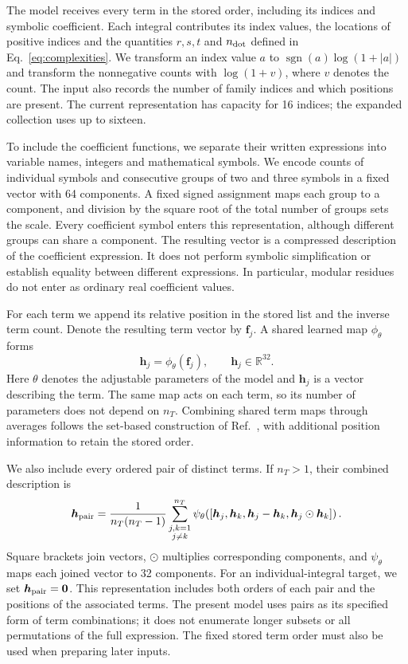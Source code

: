 The model receives every term in the stored order, including its
indices and symbolic coefficient. Each integral contributes its index
values, the locations of positive indices and the quantities $r,s,t$
and $n_{\rm dot}$ defined in Eq.~\eqref{eq:complexities}.
We transform an index value $a$ to
$\operatorname{sgn}(a)\log(1+|a|)$ and transform the nonnegative
counts with $\log(1+v)$, where $v$ denotes the count. The input
also records the number of family indices and which positions are
present. The current representation has capacity for 16 indices;
the expanded collection uses up to sixteen.

To include the coefficient functions, we separate their written
expressions into variable names, integers and mathematical symbols.
We encode counts of individual symbols and consecutive groups of
two and three symbols in a fixed vector with 64 components.
A fixed signed assignment maps each group to a component, and division
by the square root of the total number of groups sets the scale.
Every coefficient symbol enters this representation, although
different groups can share a component. The resulting vector is a
compressed description of the coefficient expression. It does not
perform symbolic simplification or establish equality between
different expressions. In particular, modular residues do not enter
as ordinary real coefficient values.

For each term we append its relative position in the stored list and
the inverse term count. Denote the resulting term vector by
$\boldsymbol f_j$. A shared learned map $\phi_\theta$ forms
\begin{equation}
 \boldsymbol h_j=\phi_\theta(\boldsymbol f_j),
 \qquad \boldsymbol h_j\in\mathbb R^{32}.
 \label{eq:seed-term-embedding}
\end{equation}
Here $\theta$ denotes the adjustable parameters of the model and
$\boldsymbol h_j$ is a vector describing the term. The same map
acts on each term, so its number of parameters does not depend on
$n_T$. Combining shared term maps through averages follows the
set-based construction of Ref.~\cite{DeepSets}, with additional
position information to retain the stored order.

We also include every ordered pair of distinct terms. If $n_T>1$,
their combined description is
\begin{equation}
 \boldsymbol h_{\rm pair}
 =\frac{1}{n_T(n_T-1)}
   \sum_{\substack{j,k=1\\j\ne k}}^{n_T}
   \psi_\theta\!\left(
      [\boldsymbol h_j,\boldsymbol h_k,
       \boldsymbol h_j-\boldsymbol h_k,
       \boldsymbol h_j\odot\boldsymbol h_k]\right).
 \label{eq:seed-pair-embedding}
\end{equation}
Square brackets join vectors, $\odot$ multiplies corresponding
components, and $\psi_\theta$ maps each joined vector to 32 components.
For an individual-integral target, we set
$\boldsymbol h_{\rm pair}=\boldsymbol0$. This representation includes
both orders of each pair and the positions of the associated terms.
The present model uses pairs as its specified form of term combinations;
it does not enumerate longer subsets or all permutations of the full
expression. The fixed stored term order must also be used when preparing
later inputs.

